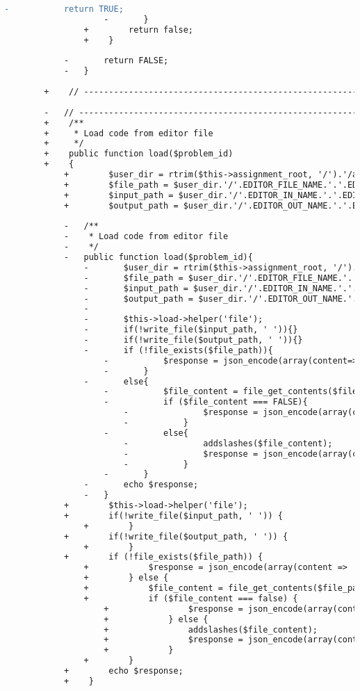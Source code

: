 \begin{lstlisting}[language=diff, caption=Perubahan pada kode Submit.php]
					-			return TRUE;
					-		}
				+        return false;
				+    }
			
			-		return FALSE;
			-	}
		
		+    // ------------------------------------------------------------------------
		
		-	// ------------------------------------------------------------------------
		+    /**
		+     * Load code from editor file
		+     */
		+    public function load($problem_id)
		+    {
			+        $user_dir = rtrim($this->assignment_root, '/').'/assignment_'.$this->user->selected_assignment['id'].'/p'.$problem_id.'/'.$this->user->username;
			+        $file_path = $user_dir.'/'.EDITOR_FILE_NAME.'.'.EDITOR_FILE_EXT;
			+        $input_path = $user_dir.'/'.EDITOR_IN_NAME.'.'.EDITOR_FILE_EXT;
			+        $output_path = $user_dir.'/'.EDITOR_OUT_NAME.'.'.EDITOR_FILE_EXT;
			
			-	/**
			-	 * Load code from editor file
			-	 */
			-	public function load($problem_id){
				-		$user_dir = rtrim($this->assignment_root, '/').'/assignment_'.$this->user->selected_assignment['id'].'/p'.$problem_id.'/'.$this->user->username;
				-		$file_path = $user_dir.'/'.EDITOR_FILE_NAME.'.'.EDITOR_FILE_EXT;
				-		$input_path = $user_dir.'/'.EDITOR_IN_NAME.'.'.EDITOR_FILE_EXT;
				-		$output_path = $user_dir.'/'.EDITOR_OUT_NAME.'.'.EDITOR_FILE_EXT;
				-		
				-		$this->load->helper('file');
				-		if(!write_file($input_path, ' ')){}
				-		if(!write_file($output_path, ' ')){}
				-		if (!file_exists($file_path)){
					-			$response = json_encode(array(content=>'', message=>'No saved file'));
					-		}
				-		else{
					-			$file_content = file_get_contents($file_path);
					-			if ($file_content === FALSE){
						-				$response = json_encode(array(content=>'', message=>'Unable to load'));
						-			}
					-			else{
						-				addslashes($file_content);
						-				$response = json_encode(array(content=>$file_content, message=>'Loaded'));
						-			}
					-		}
				-		echo $response;
				-	}
			+        $this->load->helper('file');
			+        if(!write_file($input_path, ' ')) {
				+        }
			+        if(!write_file($output_path, ' ')) {
				+        }
			+        if (!file_exists($file_path)) {
				+            $response = json_encode(array(content => '', message => 'No saved file'));
				+        } else {
				+            $file_content = file_get_contents($file_path);
				+            if ($file_content === false) {
					+                $response = json_encode(array(content => '', message => 'Unable to load'));
					+            } else {
					+                addslashes($file_content);
					+                $response = json_encode(array(content => $file_content, message => 'Loaded'));
					+            }
				+        }
			+        echo $response;
			+    }
		

\end{lstlisting}
